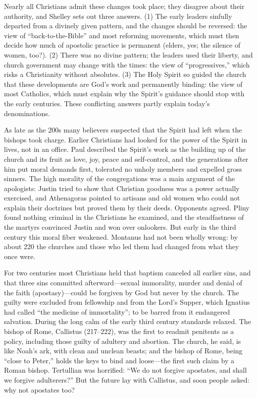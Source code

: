 Nearly all Christians admit these changes took place; they disagree about their authority, and Shelley
sets out three answers. (1) The early leaders sinfully departed from a divinely given pattern, and the
changes should be reversed: the view of ``back-to-the-Bible'' and most reforming movements, which must
then decide how much of apostolic practice is permanent (elders, yes; the silence of women, too?).
(2) There was no divine pattern; the leaders used their liberty, and church government may change
with the times: the view of ``progressives,'' which risks a Christianity without absolutes. (3) The
Holy Spirit so guided the church that these developments are God's work and permanently binding: the
view of most Catholics, which must explain why the Spirit's guidance should stop with the early
centuries. These conflicting answers partly explain today's denominations.

As late as the 200s many believers suspected that the Spirit had left when the bishops took charge.
Earlier Christians had looked for the power of the Spirit in lives, not in an office. Paul described the
Spirit's work as the building up of the church and its fruit as love, joy, peace and self-control, and
the generations after him put moral demands first, tolerated no unholy members and expelled gross
sinners. The high morality of the congregations was a main argument of the apologists: Justin tried to
show that Christian goodness was a power actually exercised, and Athenagoras pointed to artisans and
old women who could not explain their doctrines but proved them by their deeds. Opponents agreed.
Pliny found nothing criminal in the Christians he examined, and the steadfastness of the martyrs
convinced Justin and won over onlookers. But early in the third century this moral fiber weakened.
Montanus had not been wholly wrong: by about 220 the churches and those who led them had changed from what they once were.

For two centuries most Christians held that baptism canceled all earlier sins, and that three sins
committed afterward---sexual immorality, murder and denial of the faith (apostasy)---could be
forgiven by God but never by the church. The guilty were excluded from fellowship and from the Lord's
Supper, which Ignatius had called ``the medicine of immortality''; to be barred from it endangered
salvation. During the long calm of the early third century standards relaxed. The bishop of Rome,
Callistus (217--222), was the first to readmit penitents as a policy, including those guilty of
adultery and abortion. The church, he said, is like Noah's ark, with clean and unclean beasts; and the
bishop of Rome, being ``close to Peter,'' holds the keys to bind and loose---the first such claim by
a Roman bishop. Tertullian was horrified: ``We do not forgive apostates, and shall we forgive
adulterers?'' But the future lay with Callistus, and soon people asked: why not apostates too?

